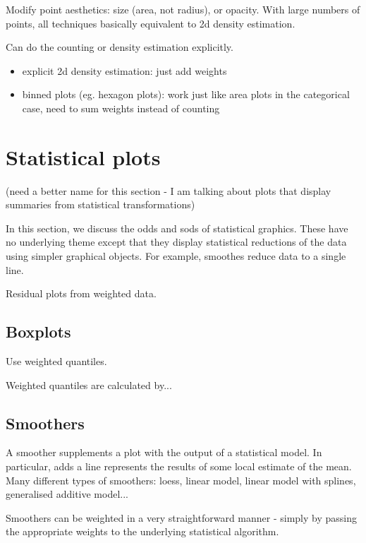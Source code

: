 \documentclass[oneside,letterpaper]{scrartcl}
\begin{document}
Modify point aesthetics: size (area, not radius), or opacity.  With large numbers of points, all techniques basically equivalent to 2d density estimation.  

Can do the counting or density estimation explicitly.  

\begin{itemize}
  \item explicit 2d density estimation: just add weights
  \item binned plots (eg. hexagon plots): work just like area plots in the categorical case, need to sum weights instead of counting
\end{itemize}

\section{Statistical plots}\label{sec:statistical_plots}

(need a better name for this section - I am talking about plots that display summaries from statistical transformations)

In this section, we discuss the odds and sods of statistical graphics.  These have no underlying theme except that they display statistical reductions of the data using simpler graphical objects.  For example, smoothes reduce data to a single line.

Residual plots from weighted data.

\subsection{Boxplots}\label{sub:boxplots}

Use weighted quantiles.

Weighted quantiles are calculated by...

\subsection{Smoothers}\label{sub:smoothers}

A smoother supplements a plot with the output of a statistical model.  In particular, adds a line represents the results of some local estimate of the mean.  Many different types of smoothers: loess, linear model, linear model with splines, generalised additive model...

Smoothers can be weighted in a very straightforward manner - simply by passing the appropriate weights to the underlying statistical algorithm.
\end{document}
